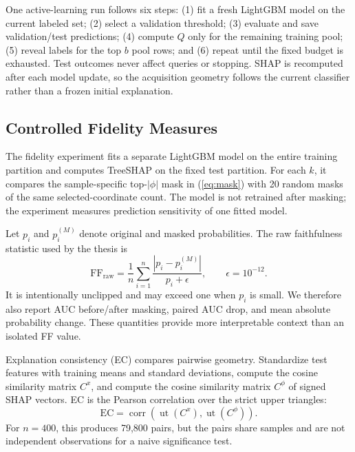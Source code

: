 One active-learning run follows six steps: (1) fit a fresh LightGBM model on the
current labeled set; (2) select a validation threshold; (3) evaluate and save
validation/test predictions; (4) compute $Q$ only for the remaining training
pool; (5) reveal labels for the top $b$ pool rows; and (6) repeat until the fixed
budget is exhausted. Test outcomes never affect queries or stopping. SHAP is
recomputed after each model update, so the acquisition geometry follows the
current classifier rather than a frozen initial explanation.

\subsection{Controlled Fidelity Measures}

The fidelity experiment fits a separate LightGBM model on the entire training
partition and computes TreeSHAP on the fixed test partition. For each $k$, it
compares the sample-specific top-$|\phi|$ mask in (\ref{eq:mask}) with 20 random
masks of the same selected-coordinate count. The model is not retrained after
masking; the experiment measures prediction sensitivity of one fitted model.

Let $p_i$ and $p_i^{(M)}$ denote original and masked probabilities. The raw
faithfulness statistic used by the thesis is
\begin{equation}
\mathrm{FF}_{\mathrm{raw}}=\frac{1}{n}\sum_{i=1}^{n}
\frac{|p_i-p_i^{(M)}|}{p_i+\epsilon},\qquad \epsilon=10^{-12}.
\label{eq:ff}
\end{equation}
It is intentionally unclipped and may exceed one when $p_i$ is small. We
therefore also report AUC before/after masking, paired AUC drop, and mean absolute
probability change. These quantities provide more interpretable context than an
isolated FF value.

Explanation consistency (EC) compares pairwise geometry. Standardize test
features with training means and standard deviations, compute the cosine
similarity matrix $C^x$, and compute the cosine similarity matrix $C^\phi$ of
signed SHAP vectors. EC is the Pearson correlation over the strict upper
triangles:
\begin{equation}
\mathrm{EC}=\operatorname{corr}
\left(\operatorname{ut}(C^x),\operatorname{ut}(C^\phi)\right).
\label{eq:ec}
\end{equation}
For $n=400$, this produces 79,800 pairs, but the pairs share samples and are not
independent observations for a naive significance test.

